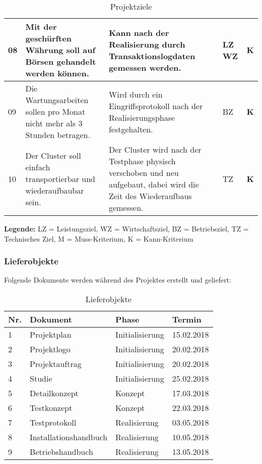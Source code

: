 \begin{table}[H]
\begin{tabular}[t]{p{0.7cm}p{6.1cm}p{6.1cm} >{\centering}p{0.6cm}c}
08 & Mit der geschürften Währung soll auf Börsen gehandelt werden können. & Kann nach der Realisierung durch Transaktionslogdaten gemessen werden. & LZ \newline WZ & \textbf{K} \\\hline
09 & Die Wartungsarbeiten sollen pro Monat nicht mehr als 3 Stunden betragen. & Wird durch ein Eingriffsprotokoll nach der Realisierungsphase festgehalten. & BZ & \textbf{K} \\\hline
10 & Der Cluster soll einfach transportierbar und wiederaufbaubar sein. & Der Cluster wird nach der Testphase physisch verschoben und neu aufgebaut, dabei wird die Zeit des Wiederaufbaus gemessen. & TZ & \textbf{K}\\\hline
\end{tabular}
\caption{Projektziele}
\end{table}

\textbf{Legende:} LZ = Leistungsziel, WZ = Wirtschaftsziel, BZ = Betriebsziel, TZ = Technisches Ziel, \newline M = Muss-Kriterium, K = Kann-Kriterium

\subsubsection{Lieferobjekte}
Folgende Dokumente werden während des Projektes erstellt und geliefert:

\begin{table}[H]
\begin{tabular}[t]{p{0.5cm}p{6.5cm}p{6.5cm}p{1.8cm}}
\hline
\rowcolor{heading}\textbf{Nr.} & \textbf{Dokument} & \textbf{Phase} & \textbf{Termin} \\\hline
1 & Projektplan & Initialisierung & 15.02.2018 \\\hline
2 & Projektlogo & Initialisierung & 20.02.2018 \\\hline
3 & Projektauftrag & Initialisierung & 20.02.2018 \\\hline
4 & Studie & Initialisierung & 25.02.2018 \\\hline
5 & Detailkonzept & Konzept & 17.03.2018 \\\hline
6 & Testkonzept & Konzept & 22.03.2018 \\\hline
7 & Testprotokoll & Realisierung & 03.05.2018 \\\hline
8 & Installationshandbuch & Realisierung & 10.05.2018 \\\hline
9 & Betriebshandbuch & Realisierung & 13.05.2018 \\\hline
\end{tabular}
\caption{Lieferobjekte}
\end{table}


 
